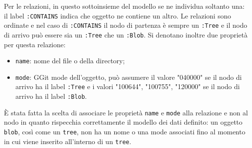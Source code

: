 Per le relazioni, in questo sottoinsieme del modello se ne individua soltanto una: il label \texttt{:CONTAINS} indica che oggetto ne contiene un altro. Le relazioni sono ordinate e nel caso di \texttt{:CONTAINS} il nodo di partenza è sempre un \texttt{:Tree} e il nodo di arrivo può essere sia un \texttt{:Tree} che un \texttt{:Blob}.
Si denotano inoltre due proprietà per questa relazione:
\begin{itemize}
    \item \texttt{name}: nome del file o della directory;
    \item \texttt{mode}: GGit mode dell'oggetto, può assumere il valore "040000" se il nodo di arrivo ha il label \texttt{:Tree} e i valori {"100644", "100755", "120000"} se il nodo di arrivo ha il label \texttt{:Blob}.
\end{itemize}

È stata fatta la scelta di associare le proprietà \texttt{name} e \texttt{mode} alla relazione e non al nodo in quanto rispecchia correttamente il modello dei dati definito: un oggetto \texttt{blob}, così come un \texttt{tree}, non ha un nome o una mode associati fino al momento in cui viene inserito all'interno di un \texttt{tree}.

